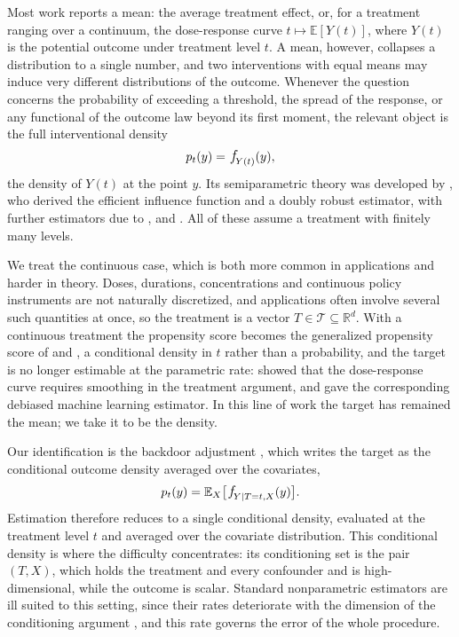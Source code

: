 \documentclass[11pt]{article}
\theoremstyle{plain}
\theoremstyle{definition}
\theoremstyle{remark}
\newcommand{\pE}{\ensuremath{\mathbb{E}}}
\newcommand{\R}{\mathbb{R}}
\newcommand{\cT}{\ensuremath{\mathcal{T}}}
\newcommand{\pf}[1]{\ensuremath{\,\mathlarger{\textit{f}}_{#1}}}
\begin{document}
Most work reports a mean: the average treatment effect, or, for a treatment ranging over
a continuum, the dose-response curve $t \mapsto \pE[Y(t)]$, where $Y(t)$ is the potential
outcome under treatment level $t$. A mean, however, collapses a distribution to a single
number, and two interventions with equal means may induce very different distributions of
the outcome. Whenever the question concerns the probability of exceeding a threshold, the
spread of the response, or any functional of the outcome law beyond its first moment, the
relevant object is the full interventional density
\[
p_t(y) = \pf{Y(t)}(y),
\]
the density of $Y(t)$ at the point $y$. Its semiparametric theory was developed by
\citet{kennedy2023density}, who derived the efficient influence function and a doubly
robust estimator, with further estimators due to \citet{melnychuk2023flows},
\citet{ham2024logconcave} and \citet{martinez2023stein}. All of these assume a treatment
with finitely many levels.

We treat the continuous case, which is both more common in applications and harder in
theory. Doses, durations, concentrations and continuous policy instruments are not
naturally discretized, and applications often involve several such quantities at once, so
the treatment is a vector $T \in \cT \subseteq \R^d$. With a continuous treatment the
propensity score becomes the generalized propensity score of \citet{imbens2000} and
\citet{hirano2004}, a conditional density in $t$ rather than a probability, and the
target is no longer estimable at the parametric rate: \citet{kennedy2017continuous} showed
that the dose-response curve requires smoothing in the treatment argument, and
\citet{colangelo2020} gave the corresponding debiased machine learning estimator. In this
line of work the target has remained the mean; we take it to be the density.

Our identification is the backdoor adjustment \citep{pearl1995,pearl2009}, which writes
the target as the conditional outcome density averaged over the covariates,
\[
p_t(y) = \pE_X\big[\pf{Y \mid T=t,X}(y)\big].
\]
Estimation therefore reduces to a single conditional density, evaluated at the treatment
level $t$ and averaged over the covariate distribution. This conditional density is where
the difficulty concentrates: its conditioning set is the pair $(T,X)$, which holds the
treatment and every confounder and is high-dimensional, while the outcome is scalar.
Standard nonparametric estimators are ill suited to this setting, since their rates
deteriorate with the dimension of the conditioning argument
\citep{stone1980,Tsybakov2009NonparametricEstimation}, and this rate governs the error of
the whole procedure.
\end{document}

